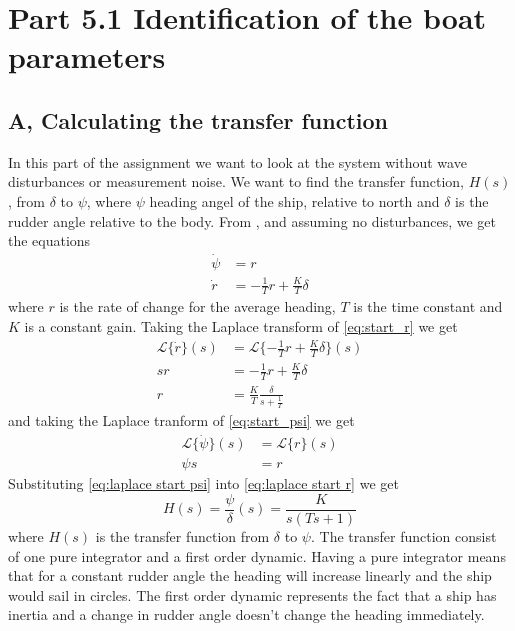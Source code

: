 \section{Part 5.1 Identification of the boat parameters}
\subsection{A, Calculating the transfer function}
In this part of the assignment we want to look at the system without wave disturbances or measurement noise. 
We want to find the transfer function, $H(s)$, from $\delta$ to $\psi$, where $\psi$ heading angel of the ship, relative to north and $\delta$ is the rudder angle relative to the body.
From \cite{assignment}, and assuming no disturbances, we get the equations 
\begin{subequations}
\begin{align}
    \dot{\psi} &= r \label{eq:start_psi}\\ 
    \dot{r} &= -\frac{1}{T} r + \frac{K}{T} \delta \label{eq:start_r}
\end{align}
\end{subequations}
where $r$ is the rate of change for the average heading, $T$ is the time constant and $K$ is a constant gain.
Taking the Laplace transform of \cref{eq:start_r} we get 
\begin{align}
    \mathcal{L}\{\dot{r}\}(s) &= \mathcal{L}\{{-\frac{1}{T} r + \frac{K}{T}
    \delta}\}(s)\nonumber\\
    s r&=-\frac{1}{T} r + \frac{K}{T}\delta\nonumber\\
    r &= \frac{K}{T}\frac{\delta}{s+\frac{1}{T}}\label{eq:laplace start r}
\end{align}
and taking the Laplace tranform of \cref{eq:start_psi} we get
\begin{align}
    \mathcal{L}\{\dot{\psi}\}(s) &= \mathcal{L}\{r\}(s)\nonumber\\
    \psi s &= r\label{eq:laplace start psi}
\end{align}
Substituting \cref{eq:laplace start psi} into \cref{eq:laplace start r} we get 
\begin{equation} \label{eq:Transfer_function}
    H(s) = \frac{\psi}{\delta}\left(s\right) = \frac{K}{s(Ts+1)}
\end{equation}
where $H(s)$ is the transfer function from $\delta$ to $\psi$. The transfer function consist of one pure integrator and a first order dynamic. Having a pure integrator means that for a constant rudder angle the heading will increase linearly and the ship would sail in circles. The first order dynamic represents the fact that a ship has inertia and a change in rudder angle doesn't change the heading immediately. 
